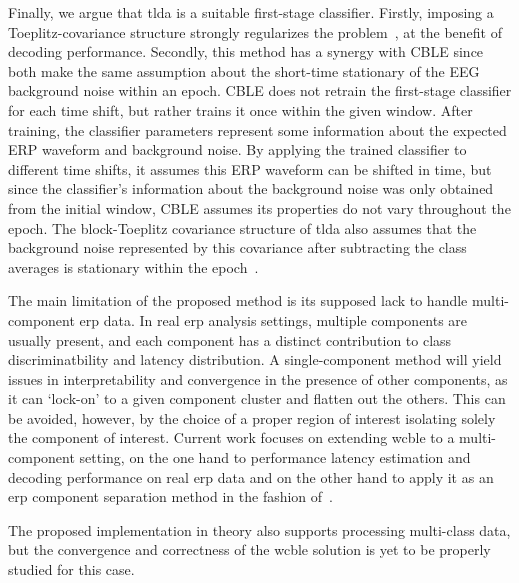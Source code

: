 Finally, we argue that \ac{tlda} is a suitable first-stage classifier.
Firstly, imposing a Toeplitz-covariance structure strongly regularizes the
problem~\cite{Sosulski2022,VanDenKerchove2022}, at the benefit of decoding performance.
Secondly, this method has a synergy with CBLE since both make the same
assumption about the short-time stationary of the EEG background noise
within an epoch.
CBLE does not retrain the first-stage classifier for each time shift, but
rather trains it once within the given window.
After training, the classifier parameters represent some information about the
expected ERP waveform and background noise.
By applying the trained classifier to different time shifts, it assumes this
ERP waveform can be shifted in time, but since the classifier's information about
the background noise was only obtained from the initial window, CBLE assumes
its properties do not vary throughout the epoch.
The block-Toeplitz covariance structure of \ac{tlda} also assumes that the
background noise represented by this covariance after subtracting the class
averages is stationary within the epoch~\cite{Sosulski2022}.


The main limitation of the proposed method is its supposed lack to handle
multi-component \ac{erp} data.
In real \ac{erp} analysis settings, multiple components are usually present,
and each component has a distinct contribution to class discriminatbility and
latency distribution.
A single-component method will yield issues in interpretability and convergence
in the presence of other components, as it can `lock-on' to a given component
cluster and flatten out the others.
This can be avoided, however, by the choice of a proper region of interest
isolating solely the component of interest.
Current work focuses on extending \ac{wcble} to a multi-component setting, on
the one hand to performance latency estimation and decoding performance on real
\ac{erp} data and on the other hand to apply it as an \ac{erp} component
separation method in the fashion of~\textcite{Oyang2017}.

The proposed implementation in theory also supports processing multi-class
data, but the convergence and correctness of the \ac{wcble} solution is yet to
be properly studied for this case.
